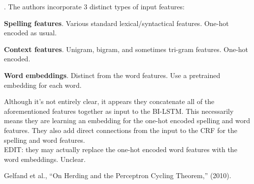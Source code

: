 \documentclass[11pt]{article}
\begin{document}
\myspace
\p {}. The authors incorporate 3 distinct types of input features:
\begin{compactitem}
	\item \textbf{Spelling features}. Various standard lexical/syntactical features. One-hot encoded as usual.
	\item \textbf{Context features}. Unigram, bigram, and sometimes tri-gram features. One-hot encoded.
	\item \textbf{Word embeddings}. Distinct from the word features. Use a pretrained embedding for each word. 
\end{compactitem}
Although it's not entirely clear, it appears they concatenate all of the aforementioned features together as input to the BI-LSTM. This necessarily means they are learning an embedding for the one-hot encoded spelling and word features. They also add direct connections from the input to the CRF for the spelling and word features. \\

EDIT: they may actually replace the one-hot encoded word features with the word embeddings. Unclear.




\vspace{-1em}
{\footnotesize Gelfand et al., ``On Herding and the Perceptron Cycling Theorem,'' (2010).}
\end{document}
